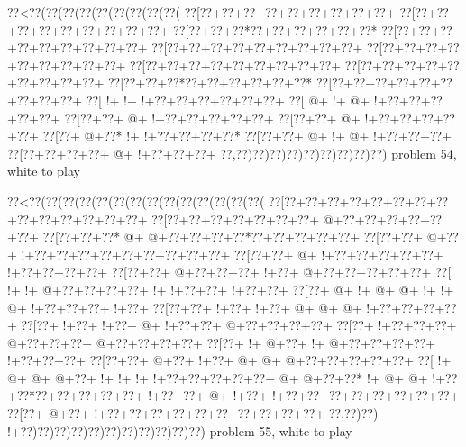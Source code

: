 \vbox{\vbox{\goo
\0??<\0??(\0??(\0??(\0??(\0??(\0??(\0??(\0??(\0??(
\0??[\0??+\0??+\0??+\0??+\0??+\0??+\0??+\0??+\0??+
\0??[\0??+\0??+\0??+\0??+\0??+\0??+\0??+\0??+\0??+
\0??[\0??+\0??+\0??*\0??+\0??+\0??+\0??+\0??+\0??*
\0??[\0??+\0??+\0??+\0??+\0??+\0??+\0??+\0??+\0??+
\0??[\0??+\0??+\0??+\0??+\0??+\0??+\0??+\0??+\0??+
\0??[\0??+\0??+\0??+\0??+\0??+\0??+\0??+\0??+\0??+
\0??[\0??+\0??+\0??+\0??+\0??+\0??+\0??+\0??+\0??+
\0??[\0??+\0??+\0??+\0??+\0??+\0??+\0??+\0??+\0??+
\0??[\0??+\0??+\0??*\0??+\0??+\0??+\0??+\0??+\0??*
\0??[\0??+\0??+\0??+\0??+\0??+\0??+\0??+\0??+\0??+
\0??[\- !+\- !+\- !+\0??+\0??+\0??+\0??+\0??+\0??+
\0??[\- @+\- !+\- @+\- !+\0??+\0??+\0??+\0??+\0??+
\0??[\0??+\0??+\- @+\- !+\0??+\0??+\0??+\0??+\0??+
\0??[\0??+\0??+\- @+\- !+\0??+\0??+\0??+\0??+\0??+
\0??[\0??+\- @+\0??*\- !+\- !+\0??+\0??+\0??+\0??*
\0??[\0??+\0??+\- @+\- !+\- @+\- !+\0??+\0??+\0??+
\0??[\0??+\0??+\0??+\0??+\- @+\- !+\0??+\0??+\0??+
\0??,\0??)\0??)\0??)\0??)\0??)\0??)\0??)\0??)\0??)
}
\hfil problem 54, white to play\hfil\break
}

\vbox{\vbox{\goo
\0??<\0??(\0??(\0??(\0??(\0??(\0??(\0??(\0??(\0??(\0??(\0??(\0??(\0??(\0??(
\0??[\0??+\0??+\0??+\0??+\0??+\0??+\0??+\0??+\0??+\0??+\0??+\0??+\0??+\0??+
\0??[\0??+\0??+\0??+\0??+\0??+\0??+\0??+\- @+\0??+\0??+\0??+\0??+\0??+\0??+
\0??[\0??+\0??+\0??*\- @+\- @+\0??+\0??+\0??+\0??*\0??+\0??+\0??+\0??+\0??+
\0??[\0??+\0??+\- @+\0??+\- !+\0??+\0??+\0??+\0??+\0??+\0??+\0??+\0??+\0??+
\0??[\0??+\0??+\- @+\- !+\0??+\0??+\0??+\0??+\0??+\- !+\0??+\0??+\0??+\0??+
\0??[\0??+\0??+\- @+\0??+\0??+\0??+\- !+\0??+\- @+\0??+\0??+\0??+\0??+\0??+
\0??[\- !+\- !+\- @+\0??+\0??+\0??+\0??+\- !+\- !+\0??+\0??+\- !+\0??+\0??+
\0??[\0??+\- @+\- !+\- @+\- @+\- !+\- !+\- @+\- !+\0??+\0??+\0??+\- !+\0??+
\0??[\0??+\0??+\- !+\0??+\- !+\0??+\- @+\- @+\- @+\- !+\0??+\0??+\0??+\0??+
\0??[\0??+\- !+\0??+\- !+\0??+\- @+\- !+\0??+\0??+\- @+\0??+\0??+\0??+\0??+
\0??[\0??+\- !+\0??+\0??+\0??+\- @+\0??+\0??+\0??+\- @+\0??+\0??+\0??+\0??+
\0??[\0??+\- !+\- @+\0??+\- !+\- @+\0??+\0??+\0??+\0??+\- !+\0??+\0??+\0??+
\0??[\0??+\0??+\- @+\0??+\- !+\0??+\- @+\- @+\- @+\0??+\0??+\0??+\0??+\0??+
\0??[\- !+\- @+\- @+\- @+\0??+\- !+\- !+\- !+\- !+\0??+\0??+\0??+\0??+\0??+
\- @+\- @+\0??+\0??*\- !+\- @+\- @+\- !+\0??+\0??*\0??+\0??+\0??+\0??+\0??+
\- !+\0??+\0??+\- @+\- !+\0??+\- !+\0??+\0??+\0??+\0??+\0??+\0??+\0??+\0??+
\0??[\0??+\- @+\0??+\- !+\0??+\0??+\0??+\0??+\0??+\0??+\0??+\0??+\0??+\0??+
\0??,\0??)\0??)\- !+\0??)\0??)\0??)\0??)\0??)\0??)\0??)\0??)\0??)\0??)\0??)
}
\hfil problem 55, white to play\hfil\break
}

